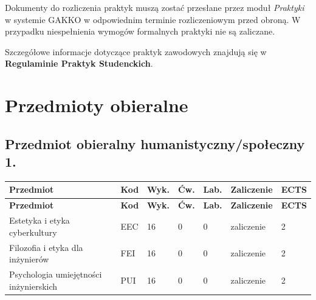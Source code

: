 \documentclass[12pt,a4paper]{article}
\newcommand{\thdrule}{\noalign{\global\setlength{\extrarowheight}{0pt}}}
\newcommand{\thdend}{\noalign{\global\setlength{\extrarowheight}{4pt}}}
\begin{document}
Dokumenty do rozliczenia praktyk muszą zostać przesłane przez moduł \textit{Praktyki} w systemie GAKKO w odpowiednim terminie rozliczeniowym przed obroną. W przypadku niespełnienia wymogów formalnych praktyki nie są zaliczane.

Szczegółowe informacje dotyczące praktyk zawodowych znajdują się w \textbf{Regulaminie Praktyk Studenckich}.

\newpage

\section{Przedmioty obieralne}


\subsection*{Przedmiot obieralny humanistyczny/społeczny 1.}

{\scriptsize
\begin{longtable}{m{5.5cm}m{0.8cm}m{1cm}m{1cm}m{1cm}m{1.7cm}m{0.7cm}}
\thdrule\toprule
\rowcolor{pjatkRed}
{\color{white}\footnotesize\textbf{\vphantom{Ag}Przedmiot}} & {\color{white}\footnotesize\textbf{\vphantom{Ag}Kod}} & {\color{white}\footnotesize\textbf{\vphantom{Ag}Wyk.}} & {\color{white}\footnotesize\textbf{\vphantom{Ag}Ćw.}} & {\color{white}\footnotesize\textbf{\vphantom{Ag}Lab.}} & {\color{white}\footnotesize\textbf{\vphantom{Ag}Zaliczenie}} & {\color{white}\footnotesize\textbf{\vphantom{Ag}ECTS}} \\
\midrule\thdend
\endfirsthead
\thdrule\toprule
\rowcolor{pjatkRed}
{\color{white}\footnotesize\textbf{\vphantom{Ag}Przedmiot}} & {\color{white}\footnotesize\textbf{\vphantom{Ag}Kod}} & {\color{white}\footnotesize\textbf{\vphantom{Ag}Wyk.}} & {\color{white}\footnotesize\textbf{\vphantom{Ag}Ćw.}} & {\color{white}\footnotesize\textbf{\vphantom{Ag}Lab.}} & {\color{white}\footnotesize\textbf{\vphantom{Ag}Zaliczenie}} & {\color{white}\footnotesize\textbf{\vphantom{Ag}ECTS}} \\
\midrule\thdend
\endhead
\rowcolor{tableRowLight} Estetyka i etyka cyberkultury & EEC & 16 & 0 & 0 & {\scriptsize zaliczenie} & 2 \\
\rowcolor{tableRowAlt} Filozofia i etyka dla inżynierów & FEI & 16 & 0 & 0 & {\scriptsize zaliczenie} & 2 \\
\rowcolor{tableRowLight} Psychologia umiejętności inżynierskich & PUI & 16 & 0 & 0 & {\scriptsize zaliczenie} & 2 \\
\bottomrule
\end{longtable}}
\end{document}
